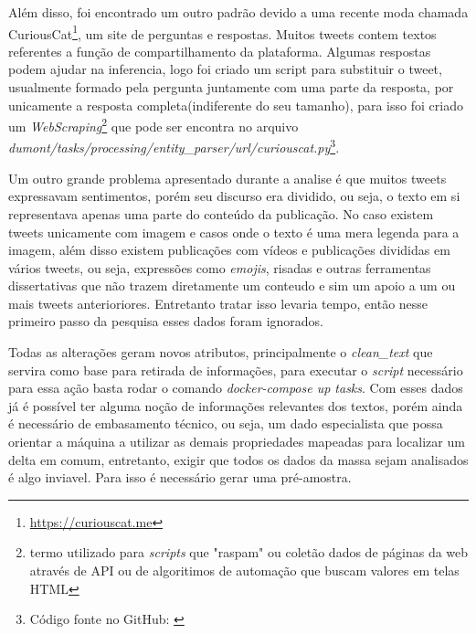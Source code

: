 Além disso, foi encontrado um outro padrão devido a uma recente moda chamada CuriousCat\footnote{\url{https://curiouscat.me}}, um site de perguntas e respostas. Muitos tweets contem textos referentes a função de compartilhamento da plataforma. Algumas respostas podem ajudar na inferencia, logo foi criado um script para substituir o tweet, usualmente formado pela pergunta juntamente com uma parte da resposta, por unicamente a resposta completa(indiferente do seu tamanho), para isso foi criado um \textit{WebScraping}\footnote{termo utilizado para \textit{scripts} que "raspam" ou coletão dados de páginas da web através de API ou de algoritimos de automação que buscam valores em telas HTML} que pode ser encontra no arquivo \textit{dumont/tasks/processing/entity\_parser/url/curiouscat.py}\footnote{Código fonte no GitHub: \url{}}.

Um outro grande problema apresentado durante a analise é que muitos tweets expressavam sentimentos, porém seu discurso era dividido, ou seja, o texto em si representava apenas uma parte do conteúdo da publicação. No caso existem tweets unicamente com imagem e casos onde o texto é uma mera legenda para a imagem, além disso existem publicações com vídeos e publicações divididas em vários tweets, ou seja, expressões como \textit{emojis}, risadas e outras ferramentas dissertativas que não trazem diretamente um conteudo e sim um apoio a um ou mais tweets anterioriores. Entretanto tratar isso levaria tempo, então nesse primeiro passo da pesquisa esses dados foram ignorados.

Todas as alterações geram novos atributos, principalmente o \textit{clean\_text} que servira como base para retirada de informações, para executar o \textit{script} necessário para essa ação basta rodar o comando \textit{docker-compose up tasks}. Com esses dados já é possível ter alguma noção de informações relevantes dos textos, porém ainda é necessário de embasamento técnico, ou seja, um dado especialista que possa orientar a máquina a utilizar as demais propriedades mapeadas para localizar um delta em comum, entretanto, exigir que todos os dados da massa sejam analisados é algo inviavel. Para isso é necessário gerar uma pré-amostra.